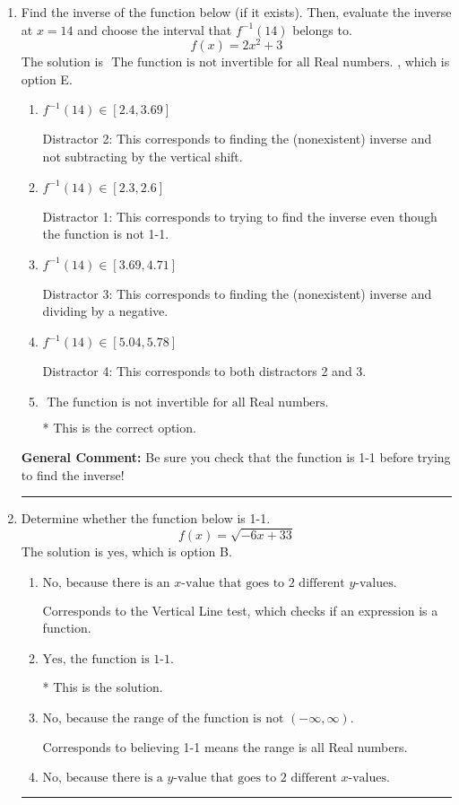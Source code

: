 \documentclass{extbook}[14pt]
\newcommand{\litem}[1]{\item #1

\rule{\textwidth}{0.4pt}}
\begin{document}
\begin{enumerate}\litem{
Find the inverse of the function below (if it exists). Then, evaluate the inverse at $x = 14$ and choose the interval that $f^{-1}(14)$ belongs to.
\[ f(x) = 2 x^2 + 3 \]The solution is \( \text{ The function is not invertible for all Real numbers. } \), which is option E.\begin{enumerate}[label=\Alph*.]
\item \( f^{-1}(14) \in [2.4, 3.69] \)

 Distractor 2: This corresponds to finding the (nonexistent) inverse and not subtracting by the vertical shift.
\item \( f^{-1}(14) \in [2.3, 2.6] \)

 Distractor 1: This corresponds to trying to find the inverse even though the function is not 1-1. 
\item \( f^{-1}(14) \in [3.69, 4.71] \)

 Distractor 3: This corresponds to finding the (nonexistent) inverse and dividing by a negative.
\item \( f^{-1}(14) \in [5.04, 5.78] \)

 Distractor 4: This corresponds to both distractors 2 and 3.
\item \( \text{ The function is not invertible for all Real numbers. } \)

* This is the correct option.
\end{enumerate}

\textbf{General Comment:} Be sure you check that the function is 1-1 before trying to find the inverse!
}
\litem{
Determine whether the function below is 1-1.
\[ f(x) = \sqrt{-6 x + 33} \]The solution is \( \text{yes} \), which is option B.\begin{enumerate}[label=\Alph*.]
\item \( \text{No, because there is an $x$-value that goes to 2 different $y$-values.} \)

Corresponds to the Vertical Line test, which checks if an expression is a function.
\item \( \text{Yes, the function is 1-1.} \)

* This is the solution.
\item \( \text{No, because the range of the function is not $(-\infty, \infty)$.} \)

Corresponds to believing 1-1 means the range is all Real numbers.
\item \( \text{No, because there is a $y$-value that goes to 2 different $x$-values.} \)


\end{enumerate}}
\end{enumerate}
\end{document}
